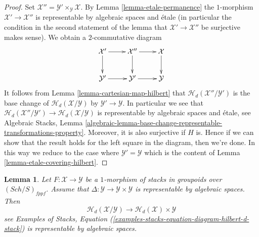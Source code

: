 \documentclass{stacks-project}
\theoremstyle{plain}
\newtheorem{lemma}[subsection]{Lemma}
\theoremstyle{definition}
\theoremstyle{remark}
\numberwithin{equation}{subsection}
\def\Sch{\mathit{Sch}}
\begin{document}
\begin{proof}
Set $\mathcal{X}'' = \mathcal{Y}' \times_\mathcal{Y} \mathcal{X}$. By
Lemma \ref{lemma-etale-permanence}
the $1$-morphism $\mathcal{X}' \to \mathcal{X}''$ is representable by
algebraic spaces and \'etale (in particular the condition in the second
statement of the lemma that $\mathcal{X}' \to \mathcal{X}''$ be surjective
makes sense). We obtain a $2$-commutative diagram
$$
\xymatrix{
\mathcal{X}' \ar[r] \ar[d] &
\mathcal{X}'' \ar[r] \ar[d] &
\mathcal{X} \ar[d] \\
\mathcal{Y}' \ar[r] &
\mathcal{Y}' \ar[r] &
\mathcal{Y}
}
$$
It follows from
Lemma \ref{lemma-cartesian-map-hilbert}
that $\mathcal{H}_d(\mathcal{X}''/\mathcal{Y}')$ is the base change
of $\mathcal{H}_d(\mathcal{X}/\mathcal{Y})$ by $\mathcal{Y}' \to \mathcal{Y}$.
In particular we see that
$\mathcal{H}_d(\mathcal{X}''/\mathcal{Y}') \to
\mathcal{H}_d(\mathcal{X}/\mathcal{Y})$ is
representable by algebraic spaces and \'etale, see
Algebraic Stacks, Lemma
\ref{algebraic-lemma-base-change-representable-transformations-property}.
Moreover, it is also surjective if $H$ is.
 Hence if we can show that
the result holds for the left square in the diagram, then we're done.
In this way we reduce to the case where $\mathcal{Y}' = \mathcal{Y}$
which is the content of
Lemma \ref{lemma-etale-covering-hilbert}.
\end{proof}

\begin{lemma}
\label{lemma-relative-hilbert}
Let $F : \mathcal{X} \to \mathcal{Y}$ be a $1$-morphism of stacks in groupoids
over $(\Sch/S)_{fppf}$. Assume that
$\Delta : \mathcal{Y} \to \mathcal{Y} \times \mathcal{Y}$
is representable by algebraic spaces. Then
$$
\mathcal{H}_d(\mathcal{X}/\mathcal{Y})
\longrightarrow
\mathcal{H}_d(\mathcal{X}) \times \mathcal{Y}
$$
see
Examples of Stacks, Equation
(\ref{examples-stacks-equation-diagram-hilbert-d-stack})
is representable by algebraic spaces.
\end{lemma}
\end{document}
